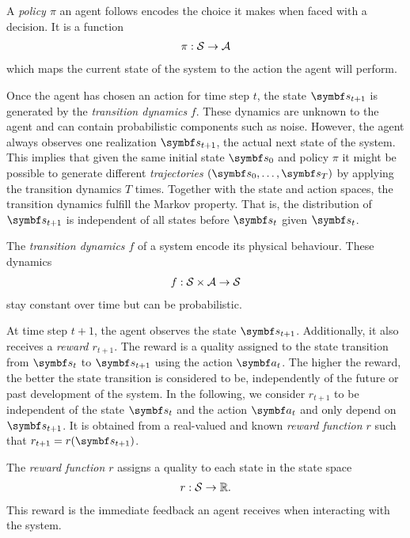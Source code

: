 \begin{definition}[Policy]
    A \emph{policy $\pi$} an agent follows encodes the choice it makes when faced with a decision.
    It is a function
    \begin{align}
        \pi: \mathcal{S} \to \mathcal{A}
    \end{align}
    which maps the current state of the system to the action the agent will perform.
\end{definition}

Once the agent has chosen an action for time step $t$, the state $\mat{s}_{t+1}$ is generated by the \emph{transition dynamics} $f$.
These dynamics are unknown to the agent and can contain probabilistic components such as noise.
However, the agent always observes one realization $\mat{s}_{t+1}$, the actual next state of the system.
This implies that given the same initial state $\mat{s}_0$ and policy $\pi$ it might be possible to generate different \emph{trajectories} $(\mat{s}_0, \dots, \mat{s}_T)$ by applying the transition dynamics $T$ times.
Together with the state and action spaces, the transition dynamics fulfill the Markov property.
That is, the distribution of $\mat{s}_{t+1}$ is independent of all states before $\mat{s}_t$ given $\mat{s}_t$.
\begin{definition}
    \label{def:transition_dynamics}
    The \emph{transition dynamics $f$} of a system encode its physical behaviour.
    These dynamics
    \begin{align}
        f: \mathcal{S} \times \mathcal{A} \to \mathcal{S}
    \end{align}
    stay constant over time but can be probabilistic.
\end{definition}

At time step $t+1$, the agent observes the state $\mat{s}_{t+1}$.
Additionally, it also receives a \emph{reward $r_{t+1}$}.
The reward is a quality assigned to the state transition from $\mat{s}_t$ to $\mat{s}_{t+1}$ using the action $\mat{a}_t$.
The higher the reward, the better the state transition is considered to be, independently of the future or past development of the system.
In the following, we consider $r_{t+1}$ to be independent of the state $\mat{s}_t$ and the action $\mat{a}_t$ and only depend on $\mat{s}_{t+1}$.
It is obtained from a real-valued and known \emph{reward function $r$} such that $r_{t+1} = r(\mat{s}_{t+1})$.
\begin{definition}
    \label{def:reward_function}
    The \emph{reward function $r$} assigns a quality to each state in the state space
    \begin{align}
        r : \mathcal{S} \to \mathbb{R}.
    \end{align}
    This reward is the immediate feedback an agent receives when interacting with the system.
\end{definition}

